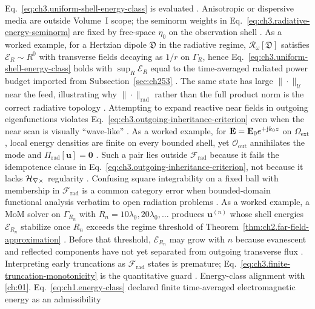 Eq.~\eqref{eq:ch3.uniform-shell-energy-class} is evaluated \cite{harrington2001}. Anisotropic or
dispersive media are outside Volume~I scope; the seminorm weights in
Eq.~\eqref{eq:ch3.radiative-energy-seminorm} are fixed by free-space \(\eta_0\) on the observation shell
\cite{stratton1941}.
As a worked example, for a Hertzian dipole \(\mathfrak{D}\) in the radiative regime, \(\mathcal{R}_\omega[\mathfrak{D}]\) satisfies
\(\mathcal{E}_{R}\sim R^{0}\) with transverse fields decaying as \(1/r\) on \(\Gamma_R\), hence
Eq.~\eqref{eq:ch3.uniform-shell-energy-class} holds with \(\sup_{R}\mathcal{E}_{R}\) equal to the
time-averaged radiated power budget imported from Subsection~\ref{sec:ch253} \cite{stratton1941}.
The same state has large \(\|\cdot\|_{\mathcal{U}}\) near the feed, illustrating why
\(\|\cdot\|_{\mathrm{rad}}\) rather than the full product norm is the correct radiative topology
\cite{harrington2001}. Attempting to expand reactive near fields in outgoing eigenfunctions violates
Eq.~\eqref{eq:ch3.outgoing-inheritance-criterion} even when the near scan is visually ``wave-like''
\cite{stratton1941}.
As a worked example, for \(\mathbf{E}=\mathbf{E}_{0}e^{+\mathrm{j} k_{0} z}\) on \(\Omega_{\mathrm{ext}}\), local energy densities are finite on every
bounded shell, yet \(\mathcal{O}_{\mathrm{out}}\) annihilates the mode and \(\Pi_{\mathrm{rad}}[\mathbf{u}]=\mathbf{0}\)
\cite{stratton1941}. Such a pair lies outside \(\mathcal{F}_{\mathrm{rad}}\) because it fails the
idempotence clause in Eq.~\eqref{eq:ch3.outgoing-inheritance-criterion}, not because it lacks
\(\mathcal{H}_{\nabla\times}\) regularity \cite{harrington2001}. Confusing square integrability on a fixed ball with membership
in \(\mathcal{F}_{\mathrm{rad}}\) is a common category error when bounded-domain functional
analysis verbatim to open radiation problems \cite{stratton1941}.
As a worked example, a MoM solver on \(\Gamma_{R_n}\) with \(R_{n}=10\lambda_0,20\lambda_0,\ldots\) produces
\(\mathbf{u}^{(n)}\) whose shell energies \(\mathcal{E}_{R_{n}}\) stabilize once
\(R_{n}\) exceeds the regime threshold of Theorem~\ref{thm:ch2.far-field-approximation}
\cite{harrington2001}. Before that threshold, \(\mathcal{E}_{R_{n}}\) may grow with \(n\) because
evanescent and reflected components have not yet separated from outgoing transverse flux
\cite{stratton1941}. Interpreting early truncations as \(\mathcal{F}_{\mathrm{rad}}\) states is premature;
Eq.~\eqref{eq:ch3.finite-truncation-monotonicity} is the quantitative guard \cite{harrington2001}.
Energy-class alignment with \ref{ch:01}. Eq.~\eqref{eq:ch1.energy-class} declared finite time-averaged electromagnetic energy as an admissibility
